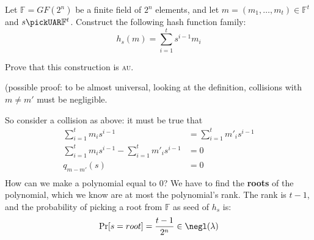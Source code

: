 \begin{exercise}
    Let $\mathbb{F} = GF(2^n)$ be a finite field of $2^n$ elements, and let $m = (m_1, \dots, m_t) \in \mathbb{F}^t$ and $s \pickUAR \mathbb{F}^t$. Construct the following hash function family:
    \[
        h_{s}(m) = \sum_{i=1}^{t}s^{i-1}m_{i}
    \]

    Prove that this construction is \textsc{au}.
\end{exercise}

\begin{solution}
    (possible proof: to be almost universal, looking at the definition, collisions with $m \not= m'$ must be negligible.

    So consider a collision as above: it must be true that  
    \begin{align*}
        \sum_{i=1}^{t} m_{i}s^{i-1}                                 &= \sum_{i=1}^{t} m'_{i}s^{i-1} \\ 
        \sum_{i=1}^{t} m_{i}s^{i-1}-\sum_{i=1}^{t} m'_{i}s^{i-1}    &= 0                            \\
        q_{m-m'}(s)                                                 &= 0                            \\
    \end{align*}
    How can we make a polynomial equal to 0? We have to find the \textbf{roots} of the polynomial, which we know are at most the polynomial's rank. The rank is $t - 1$, and the probability of picking a root from $\mathbb{F}$ as seed of $h_s$ is:
    \[
        \Pr[s=root] = \frac{t - 1}{2^{n}} \in \negl(\lambda)
    \]
\end{solution}
 
